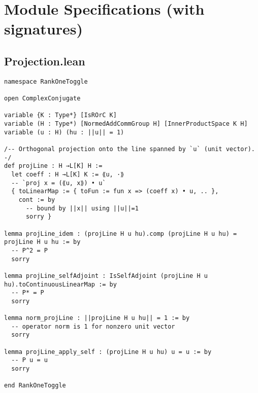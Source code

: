 \documentclass[11pt]{article}
\begin{document}
\section{Module Specifications (with signatures)}\label{sec:modules}

\subsection*{Projection.lean}
\begin{lstlisting}
namespace RankOneToggle

open ComplexConjugate

variable {K : Type*} [IsROrC K]
variable (H : Type*) [NormedAddCommGroup H] [InnerProductSpace K H]
variable (u : H) (hu : ||u|| = 1)

/-- Orthogonal projection onto the line spanned by `u` (unit vector). -/
def projLine : H →L[K] H :=
  let coeff : H →L[K] K := ⟪u, ·⟫
  -- `proj x = (⟪u, x⟫) • u`
  { toLinearMap := { toFun := fun x => (coeff x) • u, .. },
    cont := by
      -- bound by ||x|| using ||u||=1
      sorry }

lemma projLine_idem : (projLine H u hu).comp (projLine H u hu) = projLine H u hu := by
  -- P^2 = P
  sorry

lemma projLine_selfAdjoint : IsSelfAdjoint (projLine H u hu).toContinuousLinearMap := by
  -- P* = P
  sorry

lemma norm_projLine : ||projLine H u hu|| = 1 := by
  -- operator norm is 1 for nonzero unit vector
  sorry

lemma projLine_apply_self : (projLine H u hu) u = u := by
  -- P u = u
  sorry

end RankOneToggle
\end{lstlisting}
\end{document}
